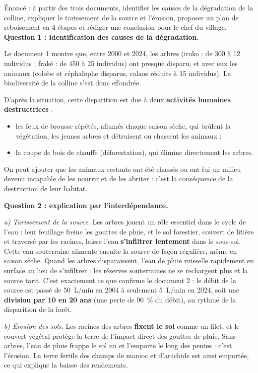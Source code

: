 \documentclass[11pt]{article}
\newcommand{\cle}[1]{{\popxbold\color{popdark}#1}}
\newcounter{popsec}
\newcounter{popsub}
\newcommand{\courssub}[1]{%
  \stepcounter{popsub}%
  \par\vspace{9pt}\noindent{\popxbold\fontsize{11.5}{13}\selectfont\color{popink}{\color{poporange}\thepopsec.\thepopsub}\hspace{6pt}#1}\par\nopagebreak\vspace{4pt}
}
\begin{document}
\courssub{Démarche et corrigé commenté}

\begin{exoresolu}
Énoncé : à partir des trois documents, identifier les causes de la dégradation de la colline, expliquer le tarissement de la source et l'érosion, proposer un plan de reboisement en 4 étapes et rédiger une conclusion pour le chef du village.
\tcblower
\textbf{Question 1 : identification des causes de la dégradation.}

Le document 1 montre que, entre 2000 et 2024, les arbres (iroko : de 300 à 12 individus ; fraké : de 450 à 25 individus) ont presque disparu, et avec eux les animaux (colobe et céphalophe disparus, calaos réduits à 15 individus). La biodiversité de la colline s'est donc effondrée.

D'après la situation, cette disparition est due à deux \textbf{activités humaines destructrices} :
\begin{itemize}
\item les \cle{feux de brousse} répétés, allumés chaque saison sèche, qui brûlent la végétation, les jeunes arbres et détruisent ou chassent les animaux ;
\item la \cle{coupe de bois} de chauffe (déforestation), qui élimine directement les arbres.
\end{itemize}
On peut ajouter que les animaux restants ont été chassés ou ont fui un milieu devenu incapable de les nourrir et de les abriter : c'est la conséquence de la destruction de leur habitat.

\textbf{Question 2 : explication par l'interdépendance.}

\emph{a) Tarissement de la source.} Les arbres jouent un rôle essentiel dans le cycle de l'eau : leur feuillage freine les gouttes de pluie, et le sol forestier, couvert de litière et traversé par les racines, laisse l'eau \textbf{s'infiltrer lentement} dans le sous-sol. Cette eau souterraine alimente ensuite la source de façon régulière, même en saison sèche. Quand les arbres disparaissent, l'eau de pluie ruisselle rapidement en surface au lieu de s'infiltrer : les réserves souterraines ne se rechargent plus et la source tarit. C'est exactement ce que confirme le document 2 : le débit de la source est passé de 50~L/min en 2004 à seulement 5~L/min en 2024, soit une \textbf{division par 10 en 20 ans} (une perte de 90~\% du débit), au rythme de la disparition de la forêt.

\emph{b) Érosion des sols.} Les racines des arbres \textbf{fixent le sol} comme un filet, et le couvert végétal protège la terre de l'impact direct des gouttes de pluie. Sans arbres, l'eau de pluie frappe le sol nu et l'emporte le long des pentes : c'est l'\cle{érosion}. La terre fertile des champs de manioc et d'arachide est ainsi emportée, ce qui explique la baisse des rendements.


\end{exoresolu}
\end{document}
